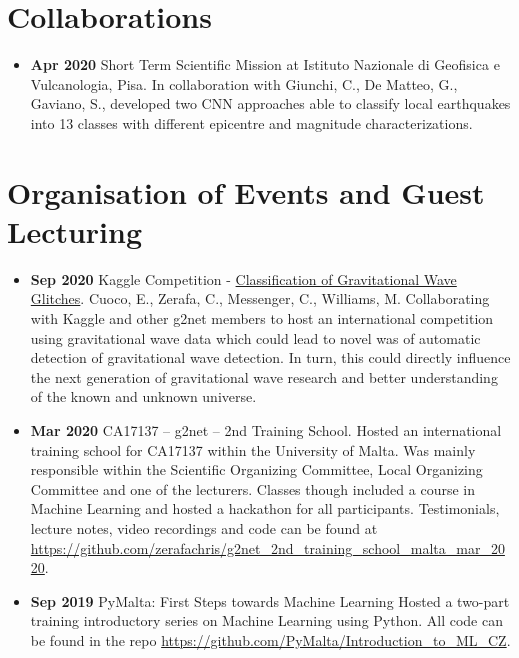 \section{Collaborations}
\begin{itemize}
    \item \textbf{Apr 2020} Short Term Scientific Mission at Istituto Nazionale di Geofisica e Vulcanologia, Pisa. \newline In collaboration with Giunchi, C., De Matteo, G., Gaviano, S., developed two CNN approaches able to classify local earthquakes into 13 classes with different epicentre and magnitude characterizations.
\end{itemize}

\section{Organisation of Events and Guest Lecturing}
\begin{itemize}
    \item \textbf{Sep 2020} Kaggle Competition - \href{https://www.kaggle.com/c/g2net-gravitational-wave-detection}{Classification of Gravitational Wave Glitches}. Cuoco, E., Zerafa, C., Messenger, C., Williams, M. \newline Collaborating with Kaggle and other g2net members to host an international competition using gravitational wave data which could lead to novel was of automatic detection of gravitational wave detection. In turn, this could directly influence the next generation of gravitational wave research and better understanding of the known and unknown universe.
    
    \item \textbf{Mar 2020} CA17137 – g2net – 2nd Training School. \newline Hosted an international training school for CA17137 within the University of Malta. Was mainly responsible within the Scientific Organizing Committee, Local Organizing Committee and one of the lecturers. Classes though included a course in Machine Learning and hosted a hackathon for all participants. Testimonials, lecture notes, video recordings and code can  be found at \url{https://github.com/zerafachris/g2net_2nd_training_school_malta_mar_2020}.
    
    \item  \textbf{Sep 2019} PyMalta: First Steps towards Machine Learning \newline Hosted a two-part training introductory series on Machine Learning using Python. All code can be found in the repo \url{https://github.com/PyMalta/Introduction_to_ML_CZ}.
\end{itemize}

